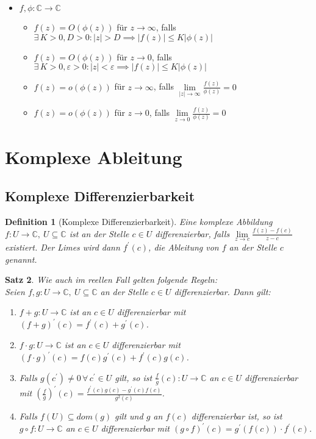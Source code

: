 \documentclass[a4paper,12pt]{article}
\renewcommand{\epsilon}{\varepsilon}
\theoremstyle{newthm}
\newtheorem{thm}{Satz}[subsection]
\theoremstyle{newdef}
\newtheorem{defn}[thm]{Definition}
\theoremstyle{newrem}
\newcommand{\C}{\mathbb{C}}
\begin{document}
\begin{itemize}
			\item $ f,\phi: \C \to \C $
				\begin{itemize}
					\item $ f(z) = O(\phi(z)) $ für $ z \to \infty $, falls $ \exists\, K>0, D>0: |z|>D \implies |f(z)| \leq K|\phi(z)| $
					\item $ f(z) = O(\phi(z)) $ für $ z \to 0 $, falls $ \exists\, K>0,\epsilon>0: |z|<\epsilon \implies |f(z)| \leq K|\phi(z)| $
					\item $ f(z) = o(\phi(z)) $ für $ z \to \infty $, falls $ \lim\limits_{|z| \to \infty} \frac{f(z)}{\phi(z)} = 0 $
					\item $ f(z) = o(\phi(z)) $ für $ z \to 0 $, falls $ \lim\limits_{z \to 0} \frac{f(z)}{\phi(z)} = 0 $
				\end{itemize}
		\end{itemize}



\section{Komplexe Ableitung}
	
	\subsection{Komplexe Differenzierbarkeit}
		
		\begin{defn}[Komplexe Differenzierbarkeit]
			Eine komplexe Abbildung $ f: U \to \C,\ U \subseteq \C $ ist an der Stelle $ c \in U $ \emph{differenzierbar}, falls $ \lim\limits_{z \to c} \frac{f(z)-f(c)}{z-c} $ existiert. Der Limes wird dann $ f^\prime(c) $, die \emph{Ableitung von $f$ an der Stelle $c$} genannt.
		\end{defn}
		
		\begin{thm}
			Wie auch im reellen Fall gelten folgende Regeln:\\
			Seien $ f,g: U \to \C,\ U \subseteq \C $ an der Stelle $ c \in U $ differenzierbar. Dann gilt:
			\begin{enumerate}[label={\roman*})]
				\item $ f+g: U \to \C $ ist an $ c \in U $ differenzierbar mit $ (f+g)^\prime(c) = f^\prime(c) + g^\prime(c) $.
				\item $ f\cdot g: U \to \C $ ist an $ c \in U $ differenzierbar mit $ (f\cdot g)^\prime(c) = f(c) g^\prime(c) + f^\prime(c) g(c) $.
				\item Falls $ g(c^\prime) \neq 0\, \forall\, c^\prime \in U $ gilt, so ist $ \frac{f}{g}(c): U \to \C $ an $ c \in U $ differenzierbar mit $ \left(\frac{f}{g}\right)^\prime(c) = \frac{f^\prime(c)g(c) - g^\prime(c)f(c)}{g^2(c)} $.
				\item Falls $ f(U) \subseteq dom(g) $ gilt und $g$ an $f(c)$ differenzierbar ist, so ist $ g \circ f: U \to \C $ an $ c \in U $ differenzierbar mit $ (g\circ f)^\prime(c) = g^\prime(f(c)) \cdot f^\prime(c) $.
			\end{enumerate}
		\end{thm}
		
\end{document}
